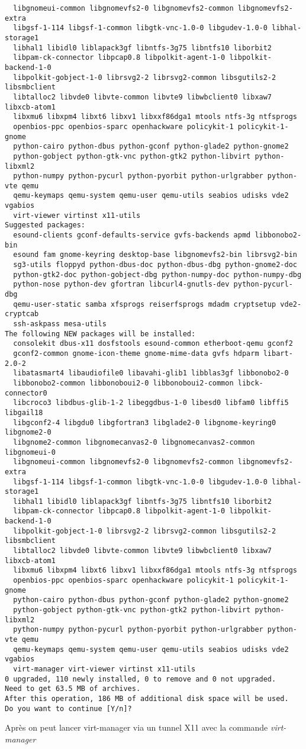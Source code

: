 \documentclass{article}
\begin{document}
\begin{lstlisting}
  libgnomeui-common libgnomevfs2-0 libgnomevfs2-common libgnomevfs2-extra
  libgsf-1-114 libgsf-1-common libgtk-vnc-1.0-0 libgudev-1.0-0 libhal-storage1
  libhal1 libidl0 liblapack3gf libntfs-3g75 libntfs10 liborbit2
  libpam-ck-connector libpcap0.8 libpolkit-agent-1-0 libpolkit-backend-1-0
  libpolkit-gobject-1-0 librsvg2-2 librsvg2-common libsgutils2-2 libsmbclient
  libtalloc2 libvde0 libvte-common libvte9 libwbclient0 libxaw7 libxcb-atom1
  libxmu6 libxpm4 libxt6 libxv1 libxxf86dga1 mtools ntfs-3g ntfsprogs
  openbios-ppc openbios-sparc openhackware policykit-1 policykit-1-gnome
  python-cairo python-dbus python-gconf python-glade2 python-gnome2
  python-gobject python-gtk-vnc python-gtk2 python-libvirt python-libxml2
  python-numpy python-pycurl python-pyorbit python-urlgrabber python-vte qemu
  qemu-keymaps qemu-system qemu-user qemu-utils seabios udisks vde2 vgabios
  virt-viewer virtinst x11-utils
Suggested packages:
  esound-clients gconf-defaults-service gvfs-backends apmd libbonobo2-bin
  esound fam gnome-keyring desktop-base libgnomevfs2-bin librsvg2-bin
  sg3-utils floppyd python-dbus-doc python-dbus-dbg python-gnome2-doc
  python-gtk2-doc python-gobject-dbg python-numpy-doc python-numpy-dbg
  python-nose python-dev gfortran libcurl4-gnutls-dev python-pycurl-dbg
  qemu-user-static samba xfsprogs reiserfsprogs mdadm cryptsetup vde2-cryptcab
  ssh-askpass mesa-utils
The following NEW packages will be installed:
  consolekit dbus-x11 dosfstools esound-common etherboot-qemu gconf2
  gconf2-common gnome-icon-theme gnome-mime-data gvfs hdparm libart-2.0-2
  libatasmart4 libaudiofile0 libavahi-glib1 libblas3gf libbonobo2-0
  libbonobo2-common libbonoboui2-0 libbonoboui2-common libck-connector0
  libcroco3 libdbus-glib-1-2 libeggdbus-1-0 libesd0 libfam0 libffi5 libgail18
  libgconf2-4 libgdu0 libgfortran3 libglade2-0 libgnome-keyring0 libgnome2-0
  libgnome2-common libgnomecanvas2-0 libgnomecanvas2-common libgnomeui-0
  libgnomeui-common libgnomevfs2-0 libgnomevfs2-common libgnomevfs2-extra
  libgsf-1-114 libgsf-1-common libgtk-vnc-1.0-0 libgudev-1.0-0 libhal-storage1
  libhal1 libidl0 liblapack3gf libntfs-3g75 libntfs10 liborbit2
  libpam-ck-connector libpcap0.8 libpolkit-agent-1-0 libpolkit-backend-1-0
  libpolkit-gobject-1-0 librsvg2-2 librsvg2-common libsgutils2-2 libsmbclient
  libtalloc2 libvde0 libvte-common libvte9 libwbclient0 libxaw7 libxcb-atom1
  libxmu6 libxpm4 libxt6 libxv1 libxxf86dga1 mtools ntfs-3g ntfsprogs
  openbios-ppc openbios-sparc openhackware policykit-1 policykit-1-gnome
  python-cairo python-dbus python-gconf python-glade2 python-gnome2
  python-gobject python-gtk-vnc python-gtk2 python-libvirt python-libxml2
  python-numpy python-pycurl python-pyorbit python-urlgrabber python-vte qemu
  qemu-keymaps qemu-system qemu-user qemu-utils seabios udisks vde2 vgabios
  virt-manager virt-viewer virtinst x11-utils
0 upgraded, 110 newly installed, 0 to remove and 0 not upgraded.
Need to get 63.5 MB of archives.
After this operation, 186 MB of additional disk space will be used.
Do you want to continue [Y/n]? 
\end{lstlisting}
Après on peut lancer virt-manager via un tunnel X11 avec la commande \emph{virt-manager}
\end{document}
